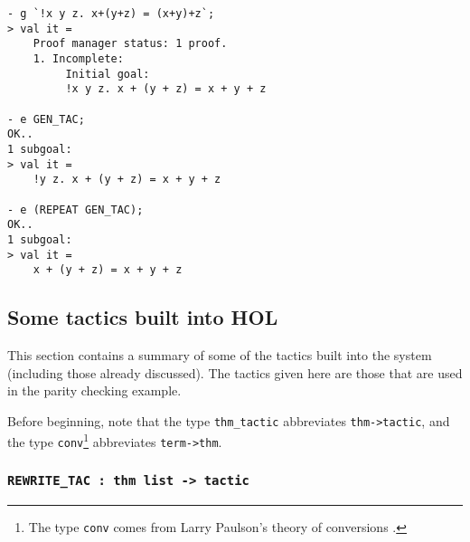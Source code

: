 \begin{session}\begin{verbatim}
- g `!x y z. x+(y+z) = (x+y)+z`;
> val it =
    Proof manager status: 1 proof.
    1. Incomplete:
         Initial goal:
         !x y z. x + (y + z) = x + y + z

- e GEN_TAC;
OK..
1 subgoal:
> val it =
    !y z. x + (y + z) = x + y + z

- e (REPEAT GEN_TAC);
OK..
1 subgoal:
> val it =
    x + (y + z) = x + y + z
\end{verbatim}\end{session}

\subsection{Some tactics built into HOL}

This section contains a summary of some of the tactics built into the
\HOL{} system (including those already discussed).  The tactics given
here are those that are used in the parity checking example.

Before beginning, note that the \ML{} type {\small\verb|thm_tactic|}
abbreviates {\small\verb|thm->tactic|}, and the type
{\small\verb|conv|}\footnote{The type {\small{\tt conv}} comes from
Larry Paulson's theory of conversions \cite{lcp-rewrite}.}
abbreviates {\small\verb|term->thm|}.

\subsubsection{\tt REWRITE\_TAC : thm list -> tactic}
\label{rewrite}

